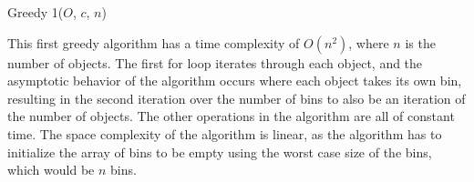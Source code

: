 \documentclass[11pt]{article}
\begin{document}
\begin{multicols}{2}
	\begin{algorithm}[H]
		\SetAlgoLined
		\SetStartEndCondition{ }{}{}%
		\AlgoDontDisplayBlockMarkers\SetAlgoNoEnd\SetAlgoNoLine%
		\caption{Greedy 1(${O}$, ${c}$, ${n}$)\label{greedy1}}
	\end{algorithm}

	This first greedy algorithm has a time complexity of ${O(n^2)}$, where ${n}$ is the number of
	objects. The first for loop iterates through each object, and the asymptotic behavior of the
	algorithm occurs where each object takes its own bin, resulting in the second iteration over the
	number of bins to also be an iteration of the number of objects. The other operations in the
	algorithm are all of constant time. The space complexity of the algorithm is linear, as the
	algorithm has to initialize the array of bins to be empty using the worst case size of the bins,
	which would be ${n}$ bins.



\end{multicols}
\end{document}
